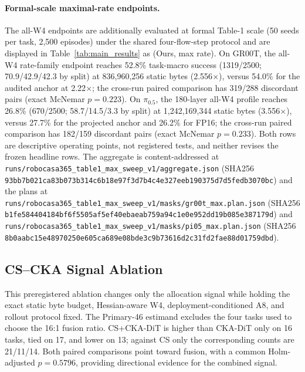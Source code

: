 \paragraph{Formal-scale maximal-rate endpoints.}
The all-W4 endpoints are additionally evaluated at formal Table-1 scale (50 seeds per task, 2,500 episodes) under the shared four-flow-step protocol and are displayed in Table~\ref{tab:main_results} as \method (Ours, max rate). On GR00T, the all-W4 rate-family endpoint reaches 52.8\% task-macro success (1319/2500; 70.9/42.9/42.3 by split) at 836,960,256 static bytes (2.556$\times$), versus 54.0\% for the audited anchor at 2.22$\times$; the cross-run paired comparison has 319/288 discordant pairs (exact McNemar $p=0.223$). On $\pi_{0.5}$, the 180-layer all-W4 profile reaches 26.8\% (670/2500; 58.7/14.5/3.3 by split) at 1,242,169,344 static bytes (3.556$\times$), versus 27.7\% for the projected anchor and 26.2\% for FP16; the cross-run paired comparison has 182/159 discordant pairs (exact McNemar $p=0.233$). Both rows are descriptive operating points, not registered tests, and neither revises the frozen headline rows. The aggregate is content-addressed at
\nolinkurl{runs/robocasa365_table1_max_sweep_v1/aggregate.json} (SHA256 \texttt{93bb7b021ca83b07\allowbreak 3b314c6b18e97f3\allowbreak d7b4c4e327eeb190\allowbreak 375d7d5fedb3070bc}) and the plans at
\nolinkurl{runs/robocasa365_table1_max_sweep_v1/masks/gr00t_max.plan.json} (SHA256 \texttt{b1fe584404184bf6\allowbreak f5505af5ef40ebae\allowbreak ab759a94c1e0e952\allowbreak dd19b085e387179d}) and
\nolinkurl{runs/robocasa365_table1_max_sweep_v1/masks/pi05_max.plan.json} (SHA256 \texttt{8b0aabc15e489702\allowbreak 50e605ca689e08bd\allowbreak e3c9b73616d2c31f\allowbreak d2fae88d01759dbd}).

\subsection{CS--CKA Signal Ablation}
\label{sec:signal_ablation}



This preregistered ablation changes only the allocation signal while holding the exact static byte budget, Hessian-aware W4, deployment-conditioned A8, and rollout protocol fixed. The Primary-46 estimand excludes the four tasks used to choose the 16:1 fusion ratio. CS+CKA-DiT is higher than CKA-DiT only on 16 tasks, tied on 17, and lower on 13; against CS only the corresponding counts are 21/11/14. Both paired comparisons point toward fusion, with a common Holm-adjusted $p=0.5796$, providing directional evidence for the combined signal.

